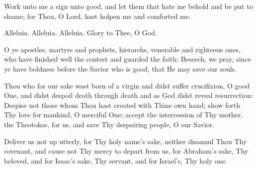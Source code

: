 {\begin{maybetwocolumns}





Work unto me a sign unto good, and let them that hate me behold and be put to shame;
for Thou, O Lord, hast holpen me and comforted me.

\end{maybetwocolumns}

\begin{reader}
  \item \gne
  \item Alleluia. Alleluia. Alleluia. Glory to Thee, O God. \thrice
  \item \lhmThree
  \item \glory
\end{reader}

\begin{maybetwocolumns}
O ye apostles, martyrs and prophets, hierarchs,
venerable and righteous ones, who have 
finished well the contest and guarded the faith:
Beseech, we pray, since ye have boldness 
before the Savior who is good, that He may save our souls.

\readerline{\nowandever}


Thou who for our sake wast born of a virgin and didst suffer crucifixion,
O good One, 
and didst despoil death through death and as God didst reveal resurrection:
Despise not those whom Thou hast created with Thine own hand;
show forth Thy love for mankind,
O merciful One; accept the intercession of Thy mother, the Theotokos,
for us, and save Thy despairing people, O our Savior.

\vbox{}
Deliver us not up utterly, for Thy holy name’s sake,
neither disannul Thou Thy covenant, 
and cause not Thy mercy to depart from us,
for Abraham’s sake, Thy beloved,
and for Isaac’s sake, Thy servant,
and for Israel’s, Thy holy one.
\end{maybetwocolumns}




\begin{maybetwocolumns}


\end{maybetwocolumns}}
